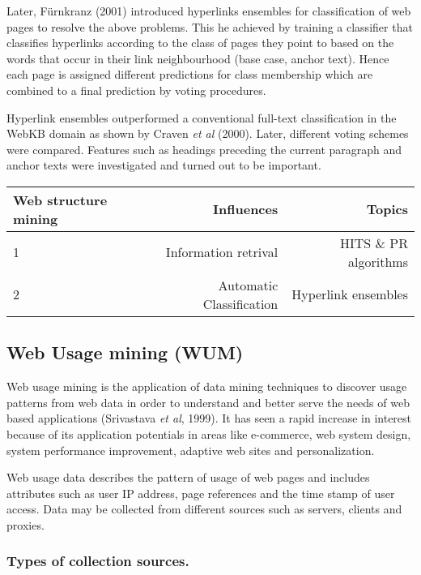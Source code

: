 \documentclass{article}
\begin{document}
Later, Fürnkranz (2001) introduced hyperlinks ensembles for classification of web pages to resolve the above problems. This he achieved by training  a classifier that classifies hyperlinks according to the class of pages they point to  based on the words that occur in their link neighbourhood (base case, anchor text). Hence each page is assigned different predictions for class membership which are combined to a final prediction by voting procedures.

Hyperlink ensembles outperformed a conventional full-text classification in the WebKB domain as shown by Craven \textit{et al} (2000). Later, different voting schemes were compared. Features such as headings preceding the current paragraph and anchor texts were investigated and turned out to be important.
\newline
\newline 
\newline

\begin{tabular}{|l|r|r|}
\hline
\hline
Web structure mining & Influences &  Topics\\
\hline
1 & Information retrival & HITS \& PR algorithms\\
\hline
2 & Automatic Classification & Hyperlink ensembles\\
\hline\end{tabular}


\pagebreak
\subsection{Web Usage mining (WUM)}
Web usage mining is the application of data mining techniques to discover usage patterns from web data in order to understand and better serve the needs of web based applications (Srivastava \textit{et al}, 1999). It has seen a rapid increase in interest because of its application potentials in areas like e-commerce, web system design, system performance improvement, adaptive web sites and personalization.

Web usage data describes the pattern of usage of web pages and includes attributes such as user IP address, page references and the time stamp of user access. Data may be collected from different sources such as servers, clients and proxies.

\subsubsection{ Types of collection sources.}
\end{document}
